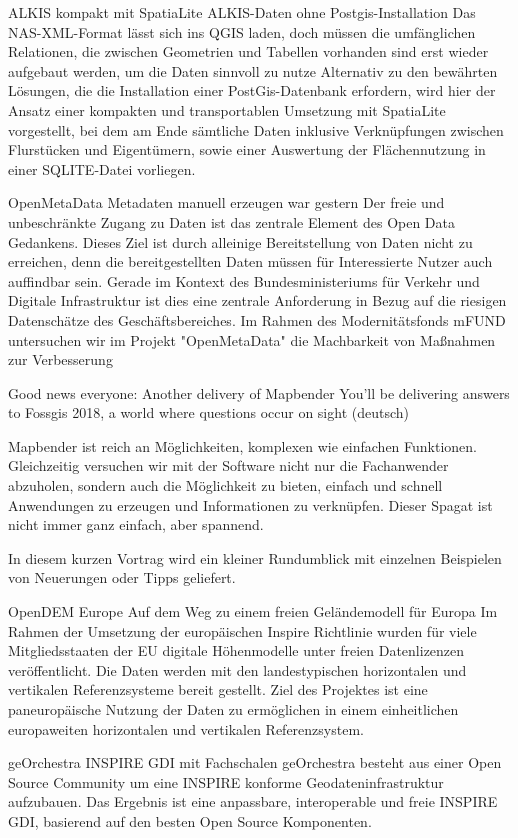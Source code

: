 %
{ALKIS kompakt mit SpatiaLite}%
{ALKIS-Daten ohne Postgis-Installation}%
{
Das NAS-XML-Format lässt sich ins QGIS laden, doch müssen die umfänglichen Relationen, die zwischen Geometrien und Tabellen vorhanden sind  erst wieder aufgebaut werden, um die Daten sinnvoll zu nutze
Alternativ zu den bewährten Lösungen, die die Installation einer PostGis-Datenbank erfordern, wird  hier der Ansatz einer kompakten und transportablen Umsetzung mit SpatiaLite vorgestellt, bei dem am Ende sämtliche Daten inklusive Verknüpfungen zwischen Flurstücken und Eigentümern, sowie einer Auswertung der Flächennutzung in einer SQLITE-Datei vorliegen.%
}

%
{OpenMetaData}%
{Metadaten manuell erzeugen war gestern}%
{
Der freie und unbeschränkte Zugang zu Daten ist das zentrale Element des Open Data Gedankens. Dieses Ziel ist durch alleinige Bereitstellung von Daten nicht zu erreichen, denn die bereitgestellten Daten müssen für Interessierte Nutzer auch auffindbar sein. Gerade im Kontext des Bundesministeriums für Verkehr und Digitale Infrastruktur ist dies eine zentrale Anforderung in Bezug auf die riesigen Datenschätze des Geschäftsbereiches. Im Rahmen des Modernitätsfonds mFUND untersuchen wir im Projekt "OpenMetaData" die Machbarkeit von Maßnahmen zur Verbesserung%
}

%
{Good news everyone: Another delivery of Mapbender}%
{You'll be delivering answers to Fossgis 2018, a world where questions occur on sight (deutsch)}%
{
Mapbender ist reich an Möglichkeiten, komplexen wie einfachen
Funktionen. Gleichzeitig versuchen wir mit der Software nicht nur die
Fachanwender abzuholen, sondern auch die Möglichkeit zu bieten, einfach und
schnell Anwendungen zu erzeugen und Informationen zu verknüpfen. Dieser
Spagat ist nicht immer ganz einfach, aber spannend.

In diesem kurzen Vortrag wird ein kleiner Rundumblick mit einzelnen
Beispielen von Neuerungen oder Tipps geliefert.%
}

%
{OpenDEM Europe }%
{Auf dem Weg zu einem freien Geländemodell für Europa}%
{
Im Rahmen der Umsetzung der europäischen Inspire Richtlinie wurden für viele Mitgliedsstaaten der EU digitale Höhenmodelle unter freien Datenlizenzen veröffentlicht. Die Daten werden mit den landestypischen horizontalen und vertikalen Referenzsysteme bereit gestellt. Ziel des Projektes ist eine paneuropäische Nutzung der Daten zu ermöglichen in einem einheitlichen europaweiten horizontalen und vertikalen Referenzsystem.%
}

%
{geOrchestra}%
{INSPIRE GDI mit Fachschalen}%
{
geOrchestra besteht aus einer Open Source Community um eine INSPIRE konforme Geodateninfrastruktur aufzubauen. Das Ergebnis ist eine anpassbare, interoperable und freie INSPIRE GDI, basierend auf den besten Open Source Komponenten.%
}

\label{bof-mittwoch}
